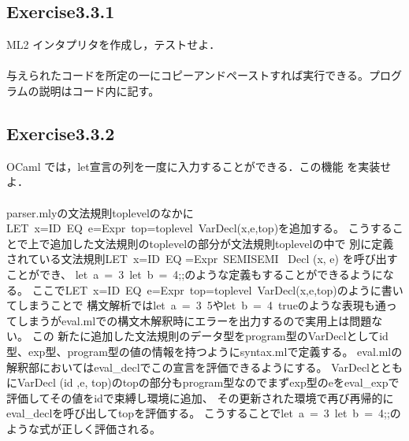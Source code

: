 \documentclass[a4paper,11pt,oneside,openany]{jsarticle}
\begin{document}
\subsection{Exercise3.3.1}
    ML2 インタプリタを作成し，テストせよ．\\\\
    与えられたコードを所定の一にコピーアンドペーストすれば実行できる。プログラムの説明はコード内に記す。

\subsection{Exercise3.3.2}
    OCaml では，let宣言の列を一度に入力することができる．この機能 を実装せよ．\\\\
    parser.mlyの文法規則toplevelのなかに LET\ x=ID\ EQ\ e=Expr\ top=toplevel\ {VarDecl(x,e,top)}を追加する。
    こうすることで上で追加した文法規則のtoplevelの部分が文法規則toplevelの中で
    別に定義されている文法規則LET\ x=ID\ EQ \e=Expr\ SEMISEMI\ { Decl (x, e) }を呼び出すことができ、
    let\ a\ =\ 3\ let\ b\ =\ 4;;のような定義もすることができるようになる。
    ここでLET\ x=ID\ EQ\ e=Expr\ top=toplevel\ {VarDecl(x,e,top)}のように書いてしまうことで
    構文解析ではlet\ a\ =\ 3\ 5やlet\ b\ =\ 4\ trueのような表現も通ってしまうがeval.mlでの構文木解釈時にエラーを出力するので実用上は問題ない。
    この 新たに追加した文法規則のデータ型をprogram型のVarDeclとしてid型、exp型、program型の値の情報を持つようにsyntax.mlで定義する。
    eval.mlの解釈部においてはeval_declでこの宣言を評価できるようにする。
    VarDeclとともにVarDecl (id ,e, top)のtopの部分もprogram型なのでまずexp型のeをeval_expで評価してその値をidで束縛し環境に追加、
    その更新された環境で再び再帰的にeval_declを呼び出してtopを評価する。
    こうすることでlet\ a\ =\ 3\ let\ b\ =\ 4;;のような式が正しく評価される。
\end{document}
